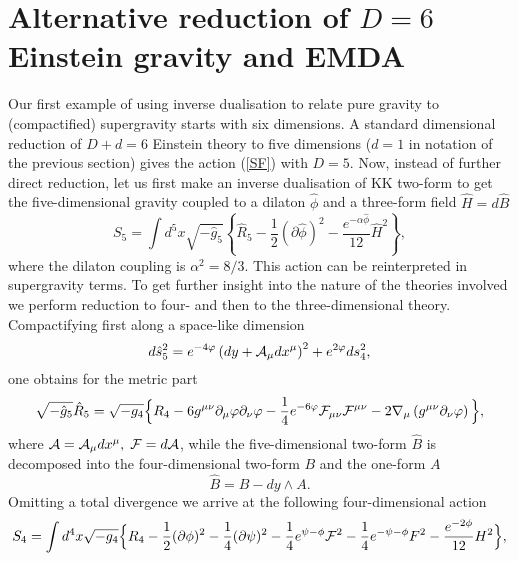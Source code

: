 \documentclass[a4paper,12pt]{article}
\begin{document}
\section{Alternative reduction of $D=6$ Einstein gravity and EMDA}
Our first example of using inverse dualisation to relate pure
gravity to (compactified) supergravity starts with six
dimensions. A standard dimensional reduction of $D+d=6$
Einstein theory to five dimensions ($d=1$ in notation of the
previous section) gives the action (\ref{SF}) with $D=5$. Now,
instead of further direct reduction, let us first make an
inverse dualisation of KK two-form to get the five-dimensional
gravity coupled to a dilaton $\hat\phi$ and a three-form field
${\hat H}=d{\hat B}$
\begin{equation}
S_{5} = \int d^5x \sqrt{-\hat g_{5}} \left\{ \hat R_{5} - \frac12
(\partial {\hat\phi})^2 - \frac{e^{-\alpha{\hat\phi}}}{12} {\hat
H}^2 \right\},
\end{equation}
where the dilaton coupling is $\alpha^2=8/3$. This action can be
reinterpreted in supergravity terms. To get further insight into
the nature of the theories involved we perform reduction to four-
and then to the three-dimensional theory. Compactifying first
along a space-like dimension
\begin{equation}
d\hat s_{5}^2 = e^{-4\varphi} \left( d y + {\cal A}_\mu dx^\mu
\right)^2 + e^{2\varphi} ds_{4}^2,
\end{equation}
one obtains for the metric part
\begin{equation}
\sqrt{-\hat g_{5}} \hat R_{5} = \sqrt{-g_{4}} \Big\{ R_{4} - 6
g^{\mu\nu} \partial_\mu \varphi \partial_\nu \varphi - \frac14
e^{-6\varphi} {\cal F}_{\mu\nu} {\cal F}^{\mu\nu} - 2\nabla_\mu
\left( g^{\mu\nu}\partial_\nu \varphi \right) \Big\},
\end{equation}
where ${\cal A} = {\cal A}_\mu d x^\mu,\; {\cal F} = d {\cal A}$,
while the five-dimensional two-form ${\hat B}$ is decomposed into
the four-dimensional two-form $B$ and the one-form $A$
\begin{equation}
{\hat B} = B - d y \wedge A.
\end{equation}
Omitting a total divergence we arrive at the
following four-dimensional action
\begin{equation}
S_{4} = \int d^4x \sqrt{-g_{4}} \Big\{ R_{4} - \frac12(\partial
\phi)^2 - \frac14(\partial \psi)^2 - \frac14 e^{\psi-\phi} {\cal
F}^2 - \frac14 e^{-\psi-\phi} F^2 - \frac{e^{-2\phi}}{12} H^2
\Bigr\},
\end{equation}
\end{document}

